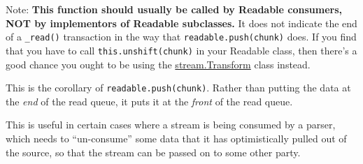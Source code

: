 Note: \textbf{This function should usually be called by Readable
consumers, NOT by implementors of Readable subclasses.} It does not
indicate the end of a \texttt{\_read()} transaction in the way that
\texttt{readable.push(chunk)} does. If you find that you have to call
\texttt{this.unshift(chunk)} in your Readable class, then there's a good
chance you ought to be using the
\hyperref[stream\_class\_stream\_transform]{stream.Transform} class
instead.

This is the corollary of \texttt{readable.push(chunk)}. Rather than
putting the data at the \emph{end} of the read queue, it puts it at the
\emph{front} of the read queue.

This is useful in certain cases where a stream is being consumed by a
parser, which needs to ``un-consume'' some data that it has
optimistically pulled out of the source, so that the stream can be
passed on to some other party.

